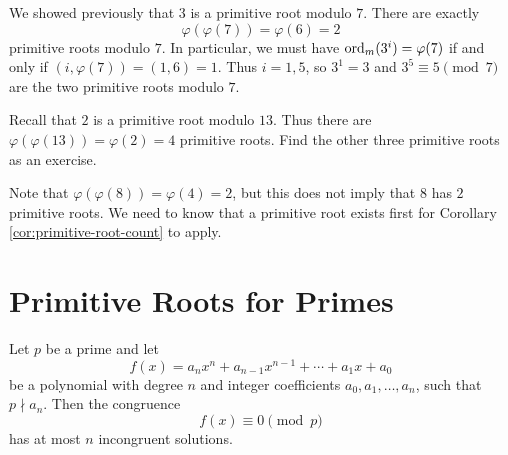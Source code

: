 \begin{example}
  We showed previously that $3$ is a
  primitive root modulo $7$. There are
  exactly
  \[\varphi(\varphi(7)) = \varphi(6) = 2\]
  primitive roots modulo $7$. In particular,
  we must have $\operatorname{ord}_m (3^i) = \varphi(7)$
  if and only if $(i, \varphi(7)) = (1, 6) = 1$.
  Thus $i = 1, 5$, so $3^1 = 3$ and
  $3^5 \equiv 5 \pmod{7}$ are the
  two primitive roots modulo $7$.
\end{example}

\begin{example}
  Recall that
  $2$ is a primitive root modulo $13$.
  Thus there are $\varphi(\varphi(13)) = \varphi(2) = 4$
  primitive roots. Find the other three
  primitive roots as an exercise.
\end{example}

\begin{remark}
  Note that $\varphi(\varphi(8)) = \varphi(4) = 2$,
  but this does not imply that $8$ has
  $2$ primitive roots. We need to know that
  a primitive root exists first for Corollary
  \ref{cor:primitive-root-count}
  to apply.
\end{remark}

\section{Primitive Roots for Primes}

\begin{theorem}[Lagrange]\label{thm:lagrange}
  Let $p$ be a prime and let
  \[
    f(x) = a_n x^n + a_{n-1} x^{n-1} + \cdots + a_1 x + a_0
  \]
  be a polynomial with degree $n$ and
  integer coefficients $a_0, a_1, \dots, a_n$,
  such that $p \nmid a_n$. Then the
  congruence
  \[
    f(x) \equiv 0 \pmod{p}
  \]
  has at most $n$ incongruent solutions.
\end{theorem}


